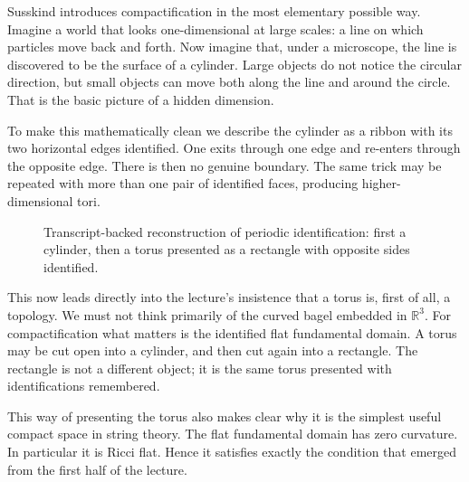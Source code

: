 Susskind introduces compactification in the most elementary possible way. Imagine a world that looks one-dimensional at large scales: a line on which particles move back and forth. Now imagine that, under a microscope, the line is discovered to be the surface of a cylinder. Large objects do not notice the circular direction, but small objects can move both along the line and around the circle. That is the basic picture of a hidden dimension.

To make this mathematically clean we describe the cylinder as a ribbon with its two horizontal edges identified. One exits through one edge and re-enters through the opposite edge. There is then no genuine boundary. The same trick may be repeated with more than one pair of identified faces, producing higher-dimensional tori.

\begin{figure}[h]
\centering
{}
\caption{Transcript-backed reconstruction of periodic identification: first a cylinder, then a torus presented as a rectangle with opposite sides identified.}
\end{figure}

This now leads directly into the lecture's insistence that a torus is, first of all, a topology. We must not think primarily of the curved bagel embedded in \(\mathbb{R}^3\). For compactification what matters is the identified flat fundamental domain. A torus may be cut open into a cylinder, and then cut again into a rectangle. The rectangle is not a different object; it is the same torus presented with identifications remembered.

This way of presenting the torus also makes clear why it is the simplest useful compact space in string theory. The flat fundamental domain has zero curvature. In particular it is Ricci flat. Hence it satisfies exactly the condition that emerged from the first half of the lecture.

